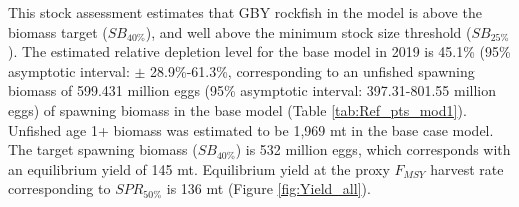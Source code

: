 \documentclass[12pt,]{article}
\begin{document}
This stock assessment estimates that GBY rockfish in the model is above
the biomass target (\(SB_{40\%}\)), and well above the minimum stock
size threshold (\(SB_{25\%}\)). The estimated relative depletion level
for the base model in 2019 is 45.1\% (95\% asymptotic interval: \(\pm\)
28.9\%-61.3\%, corresponding to an unfished spawning biomass of 599.431
million eggs (95\% asymptotic interval: 397.31-801.55 million eggs) of
spawning biomass in the base model (Table \ref{tab:Ref_pts_mod1}).
Unfished age 1+ biomass was estimated to be 1,969 mt in the base case
model. The target spawning biomass (\(SB_{40\%}\)) is 532 million eggs,
which corresponds with an equilibrium yield of 145 mt. Equilibrium yield
at the proxy \(F_{MSY}\) harvest rate corresponding to \(SPR_{50\%}\) is
136 mt (Figure \ref{fig:Yield_all}).

\FloatBarrier
\end{document}
